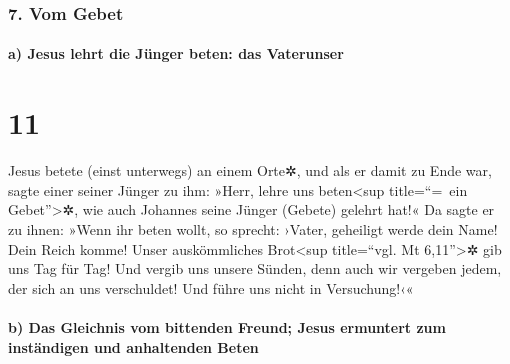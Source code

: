 \hypertarget{vom-gebet}{%
\subsubsection{7. Vom Gebet}\label{vom-gebet}}

\hypertarget{a-jesus-lehrt-die-juxfcnger-beten-das-vaterunser}{%
\paragraph{a) Jesus lehrt die Jünger beten: das
Vaterunser}\label{a-jesus-lehrt-die-juxfcnger-beten-das-vaterunser}}

\hypertarget{section-10}{%
\section{11}\label{section-10}}

 Jesus betete (einst unterwegs) an einem Orte✲, und als er
damit zu Ende war, sagte einer seiner Jünger zu ihm: »Herr, lehre uns
beten\textless sup title=``=~ein Gebet''\textgreater✲, wie auch Johannes
seine Jünger (Gebete) gelehrt hat!«  Da sagte er zu ihnen:
»Wenn ihr beten wollt, so sprecht: ›Vater, geheiligt werde dein Name!
Dein Reich komme!  Unser auskömmliches Brot\textless sup
title=``vgl. Mt 6,11''\textgreater✲ gib uns Tag für Tag! 
Und vergib uns unsere Sünden, denn auch wir vergeben jedem, der sich an
uns verschuldet! Und führe uns nicht in Versuchung!‹«

\hypertarget{b-das-gleichnis-vom-bittenden-freund-jesus-ermuntert-zum-instuxe4ndigen-und-anhaltenden-beten}{%
\paragraph{b) Das Gleichnis vom bittenden Freund; Jesus ermuntert zum
inständigen und anhaltenden
Beten}\label{b-das-gleichnis-vom-bittenden-freund-jesus-ermuntert-zum-instuxe4ndigen-und-anhaltenden-beten}}

